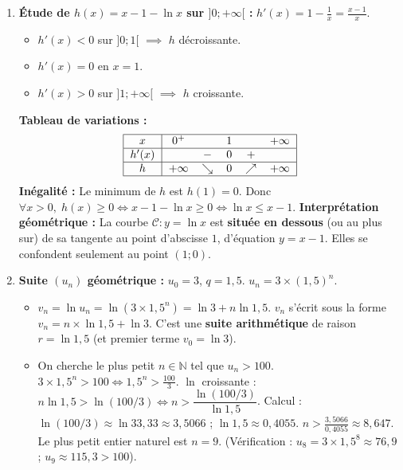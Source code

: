 \documentclass[11pt]{article}
\begin{document}
\begin{corrige}
\begin{enumerate}
    \item \textbf{Étude de $h(x) = x - 1 - \ln x$ sur $]0;+\infty[$ :}
    $h'(x) = 1 - \frac{1}{x} = \frac{x-1}{x}$.
    \begin{itemize}
        \item $h'(x) < 0$ sur $]0;1[$ $\implies$ $h$ décroissante.
        \item $h'(x) = 0$ en $x=1$.
        \item $h'(x) > 0$ sur $]1;+\infty[$ $\implies$ $h$ croissante.
    \end{itemize}
    \textbf{Tableau de variations :}
    \[
    \begin{tabular}{|c|ccccc|}\hline
    $x$ & $0^+$ & & $1$ & & $+\infty$ \\ \hline
    $h'(x)$ & & $-$ & $0$ & $+$ & \\ \hline
    $h$ & $+\infty$ & $\searrow$ & $0$ & $\nearrow$ & $+\infty$ \\ \hline
    \end{tabular}
    \]
    \textbf{Inégalité :} Le minimum de $h$ est $h(1)=0$. Donc $\forall x>0,\; h(x) \ge 0 \iff x-1-\ln x \ge 0 \iff \boxed{\ln x \le x-1}$.
    \textbf{Interprétation géométrique :} La courbe $\mathcal{C} : y = \ln x$ est \textbf{située en dessous} (ou au plus sur) de sa tangente au point d'abscisse $1$, d'équation $y = x-1$. Elles se confondent seulement au point $(1;0)$.
    \item \textbf{Suite $(u_n)$ géométrique :} $u_0=3$, $q=1,5$. $u_n = 3 \times (1,5)^n$.
    \begin{itemize}
        \item $v_n = \ln u_n = \ln(3 \times 1,5^n) = \ln 3 + n \ln 1,5$.
        $v_n$ s'écrit sous la forme $v_n = n \times \ln 1,5 + \ln 3$.
        C'est une \textbf{suite arithmétique} de raison $\boxed{r = \ln 1,5}$ (et premier terme $v_0 = \ln 3$).
        \item On cherche le plus petit $n \in \mathbb{N}$ tel que $u_n > 100$.
        $3 \times 1,5^n > 100 \iff 1,5^n > \frac{100}{3}$.
        $\ln$ croissante : $n \ln 1,5 > \ln(100/3) \iff n > \dfrac{\ln(100/3)}{\ln 1,5}$.
        Calcul : $\ln(100/3) \approx \ln 33,33 \approx 3,5066$ ; $\ln 1,5 \approx 0,4055$.
        $n > \frac{3,5066}{0,4055} \approx 8,647$.
        Le plus petit entier naturel est $\boxed{n = 9}$.
        (Vérification : $u_8 = 3 \times 1,5^8 \approx 76,9$ ; $u_9 \approx 115,3 > 100$).

\end{itemize}
\end{enumerate}
\end{corrige}
\end{document}
